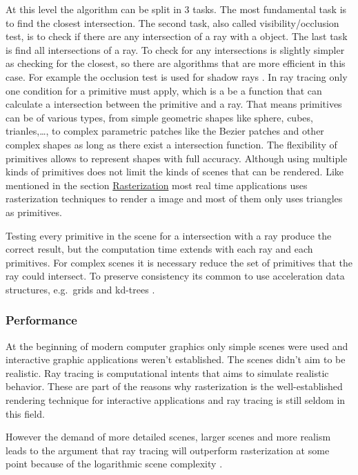 At this level the algorithm can be split in 3 tasks. The most
fundamental task is to find the closest intersection. The second task,
also called visibility/occlusion test, is to check if there are any
intersection of a ray with a object. The last task is find all
intersections of a ray. To check for any intersections is slightly
simpler as checking for the closest, so there are algorithms that are
more efficient in this case. For example the occlusion test is used for
shadow rays \cite{wald}. In ray tracing only one condition for a
primitive must apply, which is a be a function that can calculate a
intersection between the primitive and a ray. That means primitives can
be of various types, from simple geometric shapes like sphere, cubes,
trianles,\ldots{}, to complex parametric patches like the Bezier patches
and other complex shapes as long as there exist a intersection function.
The flexibility of primitives allows to represent shapes with full
accuracy. Although using multiple kinds of primitives does not limit the
kinds of scenes that can be rendered. Like mentioned in the section
\hyperref[rasterization]{Rasterization} most real time applications uses
rasterization techniques to render a image and most of them only uses
triangles as primitives.

Testing every primitive in the scene for a intersection with a ray
produce the correct result, but the computation time extends with each
ray and each primitives. For complex scenes it is necessary reduce the
set of primitives that the ray could intersect. To preserve consistency
its common to use acceleration data structures, e.g.~grids and kd-trees
\cite{copy}.

\subsubsection{Performance}\label{performance}

At the beginning of modern computer graphics only simple scenes were
used and interactive graphic applications weren't established. The
scenes didn't aim to be realistic. Ray tracing is computational intents
that aims to simulate realistic behavior. These are part of the reasons
why rasterization is the well-established rendering technique for
interactive applications and ray tracing is still seldom in this field.

However the demand of more detailed scenes, larger scenes and more
realism leads to the argument that ray tracing will outperform
rasterization at some point because of the logarithmic scene complexity
\cite{wald}.

